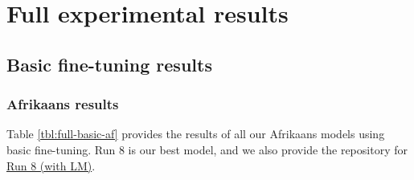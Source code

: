 \chapter{Full experimental results}
\makeatletter{}\makeatother
\label{appen:results}





\section{Basic fine-tuning results}

\subsection{Afrikaans results}
Table \ref{tbl:full-basic-af} provides the results of all our Afrikaans models using basic fine-tuning. 
Run 8 is our best model, and we also provide the repository for \href{https://huggingface.co/lucas-meyer/xls-r-asr_af-run8-with-LM}{Run 8 (with LM)}.
